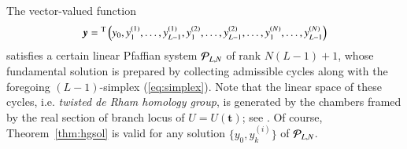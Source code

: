 \documentclass[12pt]{article}
\numberwithin{equation}{section}
\begin{document}
The vector-valued function
\[
{\boldsymbol y}=
{}^{\rm T}\left(
y_0,y_1^{(1)},\ldots,y_{L-1}^{(1)},
y_1^{(2)},\ldots,y_{L-1}^{(2)},
 \ldots,
y_1^{(N)},\ldots,y_{L-1}^{(N)}
\right)
\]
satisfies a certain linear Pfaffian system
${\cal P}_{L,N}$
of rank $N(L-1)+1$,
whose
fundamental solution is prepared 
by collecting admissible cycles 
along with the foregoing $(L-1)$-simplex (\ref{eq:simplex}).
Note that the linear space of these cycles,
i.e. {\it twisted de Rham homology group}, 
is generated
by the chambers framed by the real section
of branch locus of 
$U=U({\boldsymbol t})$;
see  \cite{ak11, tsu12b}.
Of course, Theorem~\ref{thm:hgsol} is valid 
for any solution $\{y_0, y_k^{(i)}\}$
of ${\cal P}_{L,N}$.
\end{document}
